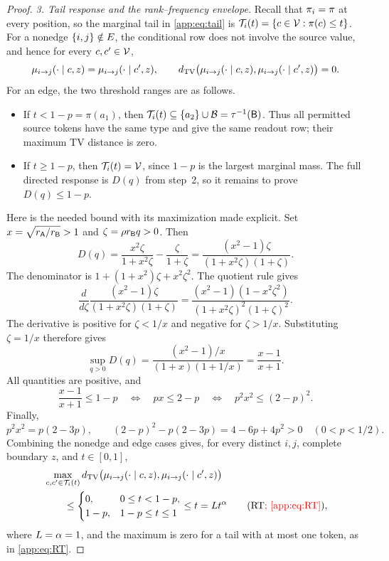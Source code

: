\begin{proof}
\emph{3. Tail response and the rank--frequency envelope.}
Recall that $\pi_{i}=\pi$ at every position, so the marginal
tail in \eqref{app:eq:tail} is
$\mathcal T_{i}(t)=\{c\in\mathcal V:\pi(c)\le t\}$.
For a nonedge $\{i,j\}\notin E$, the conditional row does
not involve the source value, and hence for every $c,c'\in\mathcal V$,
\[
 \mu_{i\to j}(\cdot\mid c,z)=\mu_{i\to j}(\cdot\mid c',z),
 \qquad
 d_{\mathrm{TV}}\bigl(\mu_{i\to j}(\cdot\mid c,z),
            \mu_{i\to j}(\cdot\mid c',z)\bigr)=0.
\]
For an edge, the two threshold ranges are as follows.
\begin{itemize}
 \item If $t<1-p=\pi(a_1)$, then
 $\mathcal T_{i}(t)\subseteq\{a_2\}\cup\mathcal B=\tau^{-1}(\mathsf B)$.
 Thus all permitted source tokens have the same type and give the same
 readout row; their maximum TV distance is zero.
 \item If $t\ge1-p$, then $\mathcal T_{i}(t)=\mathcal V$, since $1-p$ is the
 largest marginal mass.  The full directed response is $D(q)$ from
 step~2, so it remains to prove $D(q)\le1-p$.
\end{itemize}

Here is the needed bound with its maximization made explicit.
Set $x=\sqrt{r_{\mathsf A}/r_{\mathsf B}}>1$ and
$\zeta=\rho r_{\mathsf B} q>0$.  Then
\[
 D(q)=\frac{x^2\zeta}{1+x^2\zeta}-\frac\zeta{1+\zeta}
     =\frac{(x^2-1)\zeta}{(1+x^2\zeta)(1+\zeta)}.
\]
The denominator is $1+(1+x^2)\zeta+x^2\zeta^2$.
The quotient rule gives
\[
 \frac{d}{d\zeta}
 \frac{(x^2-1)\zeta}{(1+x^2\zeta)(1+\zeta)}
 =\frac{(x^2-1)(1-x^2\zeta^2)}
        {(1+x^2\zeta)^2(1+\zeta)^2}.
\]
The derivative is positive for $\zeta<1/x$ and negative for $\zeta>1/x$.
Substituting $\zeta=1/x$ therefore gives
\[
 \sup_{q>0}D(q)
 =\frac{(x^2-1)/x}{(1+x)(1+1/x)}
 =\frac{x-1}{x+1}.
\]
All quantities are positive, and
\[
 \frac{x-1}{x+1}\le1-p
 \quad\Longleftrightarrow\quad
 px\le2-p
 \quad\Longleftrightarrow\quad
 p^2x^2\le(2-p)^2.
\]
Finally,
\[
 p^2x^2=p(2-3p),\qquad
 (2-p)^2-p(2-3p)=4-6p+4p^2>0
 \quad(0<p<1/2).
\]
Combining the nonedge and edge cases gives, for every distinct $i,j$,
complete boundary $z$, and $t\in[0,1]$,
\[
 \begin{aligned}
 &\max_{c,c'\in\TailSet{i}{t}}
 \dTV\bigl(\BoundaryRow{i}{j}{c}{z},
            \BoundaryRow{i}{j}{c'}{z}\bigr)\\
 &\qquad\le
 \begin{cases}
  0,&0\le t<1-p,\\
  1-p,&1-p\le t\le1
 \end{cases}
 \le t=\ResponseConstant t^{\ResponseExponent}
 \qquad\text{(RT\textcolor{red}{; \cref{app:eq:RT}})},
 \end{aligned}
\]
where $L=\alpha=1$, and the maximum is zero
for a tail with at most one token, as in \eqref{app:eq:RT}.


\end{proof}
